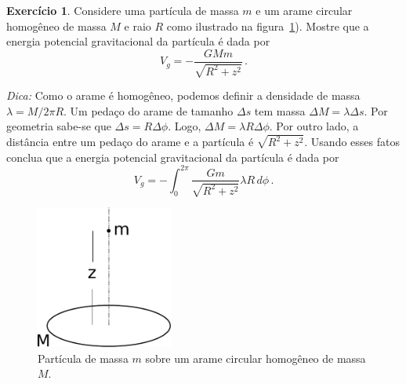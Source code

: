 \documentclass[papersize=a4,DIV=calc,twocolumn=on]{scrartcl}
\theoremstyle{definition}
\newtheorem{ex}{Exercício}[section]
\begin{document}
\begin{ex}
  Considere uma partícula de massa $m$ e um arame circular homogêneo
  de massa $M$ e raio $R$ como ilustrado na
  figura~\ref{fig:potencial_espira}). Mostre que a energia potencial
  gravitacional da partícula é dada por
  $$V_g=-\frac{GMm}{\sqrt{R^2+z^2}}\,.$$

  \noindent\textit{Dica:} Como o arame é homogêneo, podemos definir a
  densidade de massa $\lambda=M/2\pi R$. Um pedaço do arame de tamanho
  $\Delta s$ tem massa $\Delta M=\lambda\Delta s$. Por geometria
  sabe-se que $\Delta s=R\Delta\phi$. Logo,
  $\Delta M=\lambda R\Delta\phi$. Por outro lado, a distância entre um
  pedaço do arame e a partícula é $\sqrt{R^2+z^2}$. Usando esses fatos
  conclua que a energia potencial gravitacional da partícula é dada
  por
  $$V_g=-\int_0^{2\pi}\frac{Gm}{\sqrt{R^2+z^2}}\lambda R\,d\phi\,.$$
  \begin{figure}[ht]
    \centering
    \includegraphics[width=0.4\textwidth,keepaspectratio]{potencial_espira.pdf}
    \caption{Partícula de massa $m$ sobre um arame circular homogêneo
      de massa $M$.}
    \label{fig:potencial_espira}
  \end{figure}
\end{ex}
\end{document}

